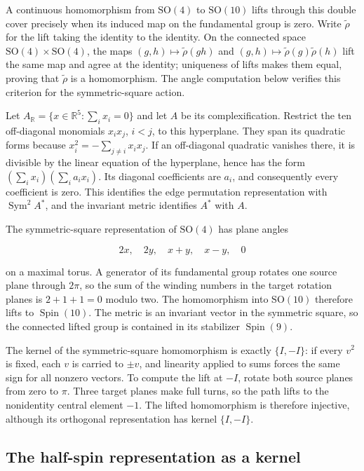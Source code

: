 \documentclass[11pt,a4paper]{article}
\begin{document}
A continuous homomorphism from \(\mathrm{SO}(4)\) to \(\mathrm{SO}(10)\) lifts through this double cover precisely when its induced map on the fundamental group is zero. Write \(\widetilde\rho\) for the lift taking the identity to the identity. On the connected space \(\mathrm{SO}(4)\times\mathrm{SO}(4)\), the maps \((g,h)\mapsto\widetilde\rho(gh)\) and \((g,h)\mapsto\widetilde\rho(g)\widetilde\rho(h)\) lift the same map and agree at the identity; uniqueness of lifts makes them equal, proving that \(\widetilde\rho\) is a homomorphism. The angle computation below verifies this criterion for the symmetric-square action.

Let \(A_{\mathbb R}=\{x\in\mathbb R^5:\sum_i x_i=0\}\) and let \(A\) be its complexification. Restrict the ten off-diagonal monomials \(x_i x_j\), \(i<j\), to this hyperplane. They span its quadratic forms because \(x_i^2=-\sum_{j\ne i}x_i x_j\). If an off-diagonal quadratic vanishes there, it is divisible by the linear equation of the hyperplane, hence has the form \((\sum_i x_i)(\sum_i a_i x_i)\). Its diagonal coefficients are \(a_i\), and consequently every coefficient is zero. This identifies the edge permutation representation with \(\operatorname{Sym}^2 A^*\), and the invariant metric identifies \(A^*\) with \(A\).

The symmetric-square representation of \(\mathrm{SO}(4)\) has plane angles

\[
2x,\quad 2y,\quad x+y,\quad x-y,\quad 0
\]

on a maximal torus. A generator of its fundamental group rotates one source plane through \(2\pi\), so the sum of the winding numbers in the target rotation planes is \(2+1+1=0\) modulo two. The homomorphism into \(\mathrm{SO}(10)\) therefore lifts to \(\operatorname{Spin}(10)\). The metric is an invariant vector in the symmetric square, so the connected lifted group is contained in its stabilizer \(\operatorname{Spin}(9)\).

The kernel of the symmetric-square homomorphism is exactly \(\{I,-I\}\): if every \(v^2\) is fixed, each \(v\) is carried to \(\pm v\), and linearity applied to sums forces the same sign for all nonzero vectors. To compute the lift at \(-I\), rotate both source planes from zero to \(\pi\). Three target planes make full turns, so the path lifts to the nonidentity central element \(-1\). The lifted homomorphism is therefore injective, although its orthogonal representation has kernel \(\{I,-I\}\).

\subsection{The half-spin representation as a kernel}\label{subsec:D3}
\end{document}
